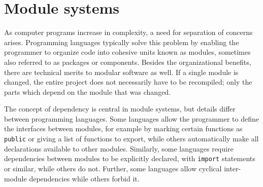 \section{Module systems}

As computer programs increase in complexity, a need for separation of concerns arises. Programming languages typically solve this problem by enabling the programmer to organize code into cohesive units known as modules, sometimes also referred to as packages or components. Besides the organizational benefits, there are technical merits to modular software as well. If a single module is changed, the entire project does not necessarily have to be recompiled; only the parts which depend on the module that was changed.

The concept of dependency is central in module systems, but details differ between programming languages. Some languages allow the programmer to define the interfaces between modules, for example by marking certain functions as \texttt{public} or giving a list of functions to export, while others automatically make all declarations available to other modules. Similarly, some languages require dependencies between modules to be explicitly declared, with \texttt{import} statements or similar, while others do not. Further, some languages allow cyclical inter-module dependencies while others forbid it. 
